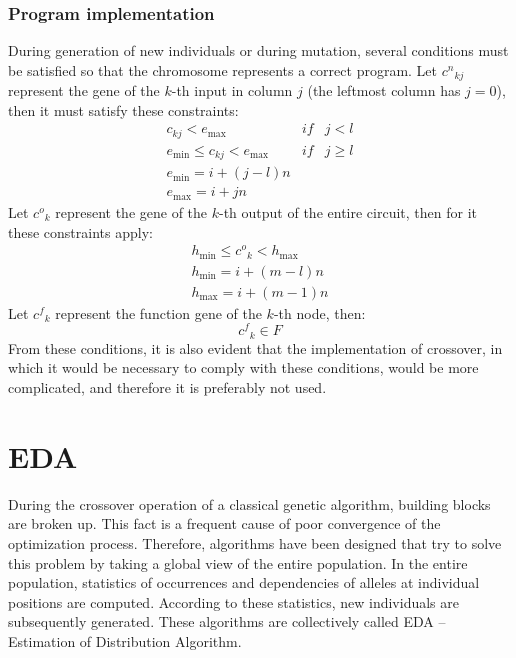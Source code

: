 \subsubsection{Program implementation}
During \cite{millerThomson} generation of new individuals or during mutation, several conditions must be satisfied so that
the chromosome represents a correct program.
Let ${c^n}_{kj}$ represent the gene of the $k$-th input in
column $j$ (the leftmost column has $j = 0$), then it must satisfy these constraints:
\begin{eqnarray}
  c_{kj} < e_{\max} & if & j < l \\
  e_{\min} \leq c_{kj} < e_{\max} & if & j \geq l \\
  e_{\min} = i + (j-l) n \\
  e_{\max} = i + j n
\end{eqnarray}
Let ${c^o}_k$ represent the gene of the $k$-th output of the entire circuit, then for it
these constraints apply:
\begin{eqnarray}
  h_{\min} \leq {c^o}_k < h_{\max} \\
  h_{\min} = i + (m - l) n \\
  h_{\max} = i + (m - 1) n
\end{eqnarray}
Let ${c^f}_k$ represent the function gene of the $k$-th node, then:
\begin{equation}
  {c^f}_k \in F
\end{equation}
From these conditions, it is also evident that the implementation of crossover,
in which it would be necessary to comply with these conditions,
would be more complicated, and therefore it is preferably not used.


\section{EDA}\label{algorithmEDA}
\cite{evo} During the crossover operation of a classical genetic algorithm, building blocks are broken up.
This fact is a frequent cause of poor convergence of the optimization process.
Therefore, algorithms have been designed that try to solve this problem by taking a global view
of the entire population. In the entire population, statistics of occurrences and dependencies of alleles at
individual positions are computed. According to these statistics, new individuals are subsequently generated.
These algorithms are collectively called EDA -- Estimation of Distribution Algorithm.

